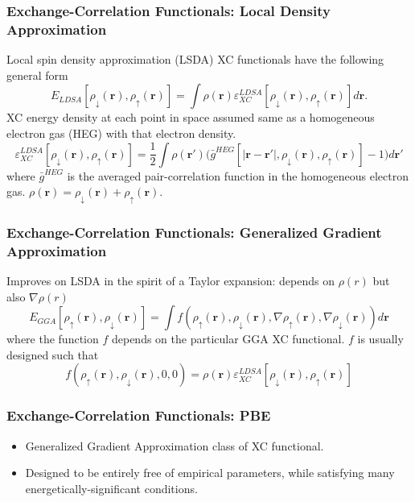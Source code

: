 \documentclass{beamer}
\newenvironment{noheadline}{
	\setbeamertemplate{headline}{}
	\addtobeamertemplate{frametitle}{\vspace*{-0.9\baselineskip}}{}
}{}
\newcommand{\insertcurrentcitation}{}
\newcommand{\currentcitation}[1]{
	\renewcommand{\insertcurrentcitation}{#1}
} %
\begin{document}
\begin{noheadline}
\currentcitation{}
\begin{frame}
\frametitle{Exchange-Correlation Functionals: Local Density Approximation}
Local spin density approximation (LSDA) XC functionals have the following general form
\begin{equation*}
E _ {LDSA}[\rho_{\downarrow}(\mathbf{r}), \rho_{\uparrow}(\mathbf{r})] = \int \rho(\mathbf{r}) \varepsilon^{LDSA}_{XC}[\rho_{\downarrow} (\mathbf{r}), \rho_{\uparrow} (\mathbf{r})]d\mathbf{r}.
\end{equation*}
XC energy density at each point in space assumed same as a homogeneous electron gas (HEG) with that electron density.
\begin{equation*}
 \varepsilon^{LDSA}_{XC}[\rho_{\downarrow} (\mathbf{r}), \rho_{\uparrow} (\mathbf{r})] = \frac{1}{2} \int \rho(\mathbf{r'})\big( \bar{g}^{HEG}[|\mathbf{r} - \mathbf{r'} |,\rho_{\downarrow} (\mathbf{r}), \rho_{\uparrow} (\mathbf{r})] -1 \big)d\mathbf{r'}
\end{equation*}
where $\bar{g}^{HEG}$ is the averaged pair-correlation function in the homogeneous electron gas. $\rho (\mathbf{r}) = \rho_{\downarrow} (\mathbf{r}) + \rho_{\uparrow}(\mathbf{r})$.
\end{frame}


\currentcitation{}
\begin{frame}
\frametitle{Exchange-Correlation Functionals: Generalized Gradient Approximation}
Improves on LSDA in the spirit of a Taylor expansion: depends on $\rho (r)$ but also $\nabla \rho (r)$
\begin{equation*}
E _ { GGA } \left[ \rho _ { \uparrow }(\mathbf{r}) , \rho _ { \downarrow }(\mathbf{r}) \right] = \int  f \left( \rho _ { \uparrow }(\mathbf{r}) , \rho _ { \downarrow }(\mathbf{r}) , \nabla \rho _ { \uparrow }(\mathbf{r}) , \nabla \rho _ { \downarrow }(\mathbf{r}) \right) d \mathbf{r}
\end{equation*}
where the function $f$ depends on the particular GGA XC functional. $f$ is usually designed such that
\begin{equation*}
f \left( \rho _ { \uparrow }(\mathbf{r}) , \rho _ { \downarrow }(\mathbf{r}) , 0 , 0 \right) = \rho (\mathbf{r}) \varepsilon^{LDSA}_{XC}[\rho_{\downarrow} (\mathbf{r}), \rho_{\uparrow} (\mathbf{r})]
\end{equation*}
\end{frame}


\currentcitation{\cite{Perdew1996}}
\begin{frame}
\frametitle{Exchange-Correlation Functionals: PBE}
\begin{itemize}
	\item Generalized Gradient Approximation class of XC functional.
	\item Designed to be entirely free of empirical parameters, while satisfying many energetically-significant conditions.
\end{itemize}
\end{frame}



\end{noheadline}
\end{document}
